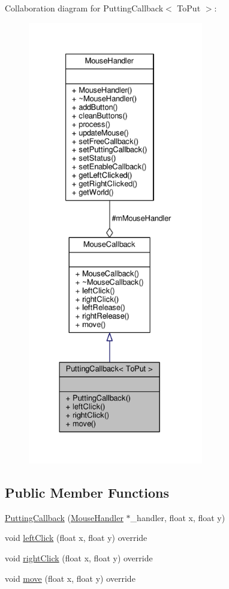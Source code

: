 Collaboration diagram for Putting\+Callback$<$ To\+Put $>$\+:\nopagebreak
\begin{figure}[H]
\begin{center}
\leavevmode
\includegraphics[height=550pt]{classPuttingCallback__coll__graph}
\end{center}
\end{figure}
\subsection*{Public Member Functions}
\begin{DoxyCompactItemize}
\item 
\hyperlink{classPuttingCallback_abd83a02e857748d0ec88e30fcf08eb5e}{Putting\+Callback} (\hyperlink{classMouseHandler}{Mouse\+Handler} $\ast$\+\_\+handler, float x, float y)
\item 
void \hyperlink{classPuttingCallback_a95d8a7c64a5c1967982c0e6ef0d36969}{left\+Click} (float x, float y) override
\item 
void \hyperlink{classPuttingCallback_a9be086c4e02d2d9911876bbe17840f10}{right\+Click} (float x, float y) override
\item 
void \hyperlink{classPuttingCallback_a9d82e38a9f790cbfeb4bf24f81110deb}{move} (float x, float y) override
\end{DoxyCompactItemize}
